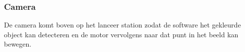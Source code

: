 \subsubsection{Camera}

De camera komt boven op het lanceer station zodat de software het gekleurde object kan detecteren en
de motor vervolgens naar dat punt in het beeld kan bewegen.
